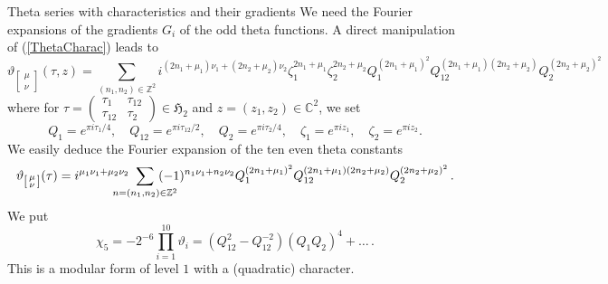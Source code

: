 \documentclass[12pt]{amsart}
\numberwithin{equation}{section}
\newcommand{\CC}{\mathbb C}
\newcommand{\ZZ}{\mathbb Z}
\numberwithin{equation}{section}
\theoremstyle{definition}
\theoremstyle{remark}
\begin{document}
\begin{section}{Theta series with characteristics and their gradients}
\bigskip
We need the Fourier expansions of the gradients $G_i$ of the odd theta functions.
A direct manipulation of (\ref{ThetaCharac}) leads to
\[
\vartheta_{
\left[
\begin{smallmatrix}
\mu \\ \nu
\end{smallmatrix}
\right]}
(\tau,z)=
\sum_{(n_1,n_2)\in {\ZZ}^2}
i^{(2n_1+\mu_1)\nu_1+(2n_2+\mu_2)\nu_2}
\zeta_1^{2n_1+\mu_1}
\zeta_2^{2n_2+\mu_2}
Q_1^{(2n_1+\mu_1)^2}
Q_{12}^{(2n_1+\mu_1)(2n_2+\mu_2)}
Q_2^{(2n_2+\mu_2)^2}
\]
where for
$
\tau=
\left(
\begin{smallmatrix}\tau_1 & \tau_{12} \\ \tau_{12} & \tau_2\end{smallmatrix}
\right)\in \mathfrak{H}_2$
and
$
z=(z_1,z_2)\in {\CC}^2
$,
we set
\[
Q_1=e^{\pi i \tau_1/4},\quad
Q_{12}=e^{\pi i \tau_{12}/2},\quad
Q_2=e^{\pi i \tau_2/4},\quad
\zeta_1=e^{\pi i z_1},\quad
\zeta_2=e^{\pi i z_2}.
\]
We easily deduce the Fourier expansion of the ten even theta constants
\begin{equation}\label{FE_Even_Theta}
\vartheta_{
\left[
\begin{smallmatrix}
\mu \\ \nu
\end{smallmatrix}
\right]}(\tau)
=
i^{\mu_1\nu_1+\mu_2\nu_2}
\hspace{-15pt}
\sum_{n=(n_1,n_2)\in {\ZZ}^2}
\hspace{-15pt}
(-1)^{n_1\nu_1+n_2\nu_2}
Q_1^{(2n_1+\mu_1)^2}
Q_{12}^{(2n_1+\mu_1)(2n_2+\mu_2)}
Q_2^{(2n_2+\mu_2)^2} \, .
\end{equation}
We put 
$$
\chi_5= -2^{-6} \prod_{i=1}^{10} \vartheta_i = (Q_{12}^2-Q_{12}^{-2})(Q_1Q_2)^4+\ldots \, .
$$
This is a modular form of level $1$ with a (quadratic) character.


\end{section}
\end{document}
